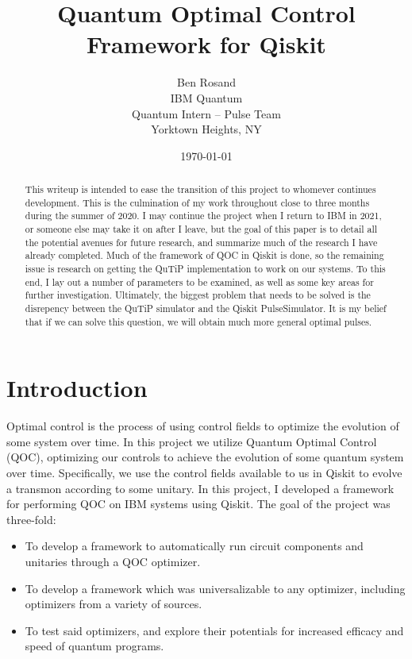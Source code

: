 \documentclass[12pt]{article}
\title{Quantum Optimal Control Framework for Qiskit}
\author{
        Ben Rosand \\
        IBM Quantum \\
        Quantum Intern -- Pulse Team\\
        Yorktown Heights, NY
}
\date{\today}
\begin{document}
\maketitle

\begin{abstract}
This writeup is intended to ease the transition of this project to whomever
continues development. This is the culmination of my work throughout close to
three months during the summer of 2020. I may continue the project when I return
to IBM in 2021, or someone else may take it on after I leave, but the goal of
this paper is to detail all the potential avenues for future research, and
summarize much of the research I have already completed. Much of the framework
of QOC in Qiskit is done, so the remaining issue is research on getting the
QuTiP implementation to work on our systems. To this end, I lay out a number of
parameters to be examined, as well as some key areas for further investigation.
Ultimately, the biggest problem that needs to be solved is the disrepency
between the QuTiP simulator and the Qiskit PulseSimulator. It is my belief that
if we can solve this question, we will obtain much more general optimal pulses.
\end{abstract}

\section{Introduction}

Optimal control is the process of using control fields to optimize the evolution
of some system over time. In this project we utilize Quantum Optimal Control
(QOC), optimizing our controls to achieve the evolution of some quantum system
over time. Specifically, we use the control fields available to us in Qiskit to
evolve a transmon according to some unitary. In this project, I developed a
framework for performing QOC on IBM systems using Qiskit. The goal of the
project was three-fold:
\begin{itemize}
    \item To develop a framework to automatically run circuit components and
    unitaries through a QOC optimizer.
    \item To develop a framework which was universalizable to any optimizer,
    including optimizers from a variety of sources.
    \item To test said optimizers, and explore their potentials for increased
    efficacy and speed of quantum programs.
\end{itemize}
\end{document}
